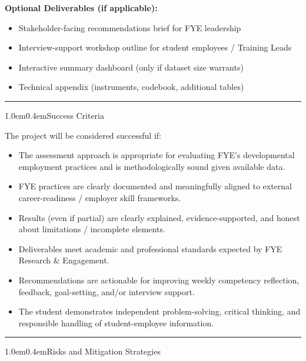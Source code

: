 \documentclass[11pt,letterpaper]{article}
\makeatletter
\newcommand{\sectionrule}{\par\vspace{0.4em}\noindent\rule{\textwidth}{0.6pt}\vspace{0.55em}}
\newcommand{\fieldlabel}[1]{\textbf{#1}}
\renewcommand\section{\@startsection{section}{1}{\z@}%
  {1.0em}{0.4em}{\large\bfseries}}
\makeatother
\begin{document}
\vspace{0.2em}
\fieldlabel{Optional Deliverables (if applicable):}
\begin{itemize}
  \item Stakeholder-facing recommendations brief for FYE leadership
  \item Interview-support workshop outline for student employees / Training Leads
  \item Interactive summary dashboard (only if dataset size warrants)
  \item Technical appendix (instruments, codebook, additional tables)
\end{itemize}

\sectionrule

\section{Success Criteria}

The project will be considered successful if:
\begin{itemize}
  \item The assessment approach is appropriate for evaluating FYE's developmental employment practices and is methodologically sound given available data.
  \item FYE practices are clearly documented and meaningfully aligned to external career-readiness / employer skill frameworks.
  \item Results (even if partial) are clearly explained, evidence-supported, and honest about limitations / incomplete elements.
  \item Deliverables meet academic and professional standards expected by FYE Research \& Engagement.
  \item Recommendations are actionable for improving weekly competency reflection, feedback, goal-setting, and/or interview support.
  \item The student demonstrates independent problem-solving, critical thinking, and responsible handling of student-employee information.
\end{itemize}

\sectionrule

\section{Risks and Mitigation Strategies}
\end{document}
